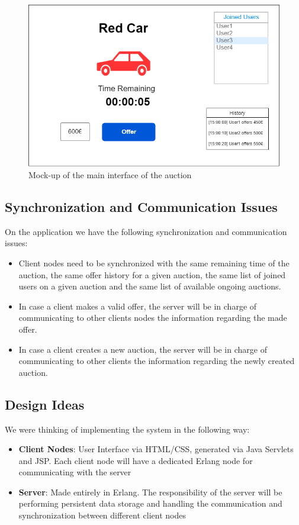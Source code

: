 \begin{figure}[H]
	\centering
	\includegraphics[width=0.7\linewidth]{img/wireframeDSMT.drawio}
	\caption{Mock-up of the main interface of the auction}
	\label{fig:wireframedsmt}
\end{figure}

\subsection{Synchronization and Communication Issues}\label{synchComIssues}
On the application we have the following synchronization and communication issues:
\begin{itemize}
	\item Client nodes need to be synchronized with the same remaining time of the auction, the same offer history for a given auction, the same list of joined users on a given auction and the same list of available ongoing auctions.
	\item In case a client makes a valid offer, the server will be in charge of  communicating to other clients nodes the information regarding the made offer. 
	\item In case a client creates a new auction, the server will be in charge of communicating to other clients the information regarding the newly created auction.
\end{itemize}


\subsection{Design Ideas}
We were thinking of implementing the system in the following way:
\begin{itemize}
	\item \textbf{Client Nodes}: User Interface via HTML/CSS, generated via Java Servlets and JSP. Each client node will have a dedicated Erlang node for communicating with the server
	\item \textbf{Server}: Made entirely in Erlang. The responsibility of the server will be performing persistent data storage and handling the communication and synchronization between different client nodes
\end{itemize}